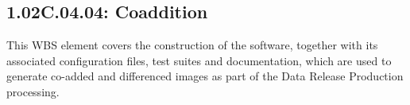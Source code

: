 \subsection{1.02C.04.04: Coaddition}

This WBS element covers the construction of the software,
together with its associated configuration files, test suites and
documentation, which are used to generate co-added and differenced
images as part of the Data Release Production processing.
